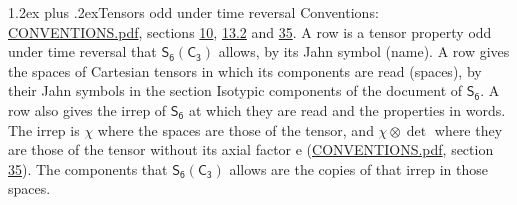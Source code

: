 \documentclass[10pt,a4paper]{article}
\makeatletter
\renewcommand\section{\@startsection{section}{1}{\z@}{-3ex plus -1ex minus -.2ex}%
  {1.2ex plus .2ex}{\normalfont\large\sffamily\bfseries\color{parttitle}}}
\numberwithin{equation}{section}
\newcommand{\grp}[1]{\mathsf{#1}}
\newcommand{\irrprod}{\otimes}
\makeatother
\begin{document}
\section{Tensors odd under time reversal}\label{s:time_odd}
Conventions: \href{../../CONVENTIONS.pdf}{CONVENTIONS.pdf}, sections \href{../../../rotation/CONVENTIONS.pdf\#conv.10}{10}, \href{../../../rotation/CONVENTIONS.pdf\#conv.13.2}{13.2} and \href{../../CONVENTIONS.pdf\#conv.35}{35}.
\leavevmode\label{n:head.name.property}A row is a tensor property odd under time reversal that $\grp{S_{6}}(\grp{C_{3}})$ allows, by its Jahn symbol (name). \label{n:head.spaces}A row gives the spaces of Cartesian tensors in which its components are read (spaces), by their Jahn symbols in the section Isotypic components of the document of \href{../../../rotation/data/pdf/S6.pdf}{$\grp{S_{6}}$}. \label{n:head.properties}A row also gives the irrep of $\grp{S_{6}}$ at which they are read and the properties in words. The irrep is $\chi$ where the spaces are those of the tensor, and $\chi \irrprod \det$ where they are those of the tensor without its axial factor e (\href{../../CONVENTIONS.pdf}{CONVENTIONS.pdf}, section \href{../../CONVENTIONS.pdf\#conv.35}{35}). The components that $\grp{S_{6}}(\grp{C_{3}})$ allows are the copies of that irrep in those spaces.
\end{document}

